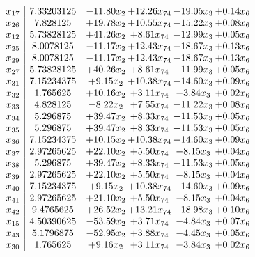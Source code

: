 \documentclass[8pt]{article}
\begin{document}
\[\begin{array}{c| c c@{\hskip 2pt} c@{\hskip 2pt} c@{\hskip 2pt} c@{\hskip 2pt} }
 x_{17}   &  7.33203125 & -11.80 x_{2} & + 12.26 x_{74} & -19.05 x_{3} & +  0.14 x_{6}\\
 x_{26}   &  7.828125 & + 19.78 x_{2} & + 10.55 x_{74} & -15.22 x_{3} & +  0.08 x_{6}\\
 x_{12}   &  5.73828125 & + 41.26 x_{2} & +  8.61 x_{74} & -12.99 x_{3} & +  0.05 x_{6}\\
 x_{25}   &  8.0078125 & -11.17 x_{2} & + 12.43 x_{74} & -18.67 x_{3} & +  0.13 x_{6}\\
 x_{29}   &  8.0078125 & -11.17 x_{2} & + 12.43 x_{74} & -18.67 x_{3} & +  0.13 x_{6}\\
 x_{27}   &  5.73828125 & + 40.26 x_{2} & +  8.61 x_{74} & -11.99 x_{3} & +  0.05 x_{6}\\
 x_{31}   &  7.15234375 & +  9.15 x_{2} & + 10.38 x_{74} & -14.60 x_{3} & +  0.09 x_{6}\\
 x_{32}   &  1.765625 & + 10.16 x_{2} & +  3.11 x_{74} & -3.84 x_{3} & +  0.02 x_{6}\\
 x_{33}   &  4.828125 & -8.22 x_{2} & +  7.55 x_{74} & -11.22 x_{3} & +  0.08 x_{6}\\
 x_{34}   &  5.296875 & + 39.47 x_{2} & +  8.33 x_{74} & -11.53 x_{3} & +  0.05 x_{6}\\
 x_{35}   &  5.296875 & + 39.47 x_{2} & +  8.33 x_{74} & -11.53 x_{3} & +  0.05 x_{6}\\
 x_{36}   &  7.15234375 & + 10.15 x_{2} & + 10.38 x_{74} & -14.60 x_{3} & +  0.09 x_{6}\\
 x_{37}   &  2.97265625 & + 22.10 x_{2} & +  5.50 x_{74} & -8.15 x_{3} & +  0.04 x_{6}\\
 x_{38}   &  5.296875 & + 39.47 x_{2} & +  8.33 x_{74} & -11.53 x_{3} & +  0.05 x_{6}\\
 x_{39}   &  2.97265625 & + 22.10 x_{2} & +  5.50 x_{74} & -8.15 x_{3} & +  0.04 x_{6}\\
 x_{40}   &  7.15234375 & +  9.15 x_{2} & + 10.38 x_{74} & -14.60 x_{3} & +  0.09 x_{6}\\
 x_{41}   &  2.97265625 & + 21.10 x_{2} & +  5.50 x_{74} & -8.15 x_{3} & +  0.04 x_{6}\\
 x_{42}   &  9.4765625 & + 26.52 x_{2} & + 13.21 x_{74} & -18.98 x_{3} & +  0.10 x_{6}\\
 x_{15}   &  4.50390625 & -53.59 x_{2} & +  3.71 x_{74} & -4.84 x_{3} & +  0.07 x_{6}\\
 x_{43}   &  5.1796875 & -52.95 x_{2} & +  3.88 x_{74} & -4.45 x_{3} & +  0.05 x_{6}\\
 x_{30}   &  1.765625 & +  9.16 x_{2} & +  3.11 x_{74} & -3.84 x_{3} & +  0.02 x_{6}\\

\end{array}\]
\end{document}
